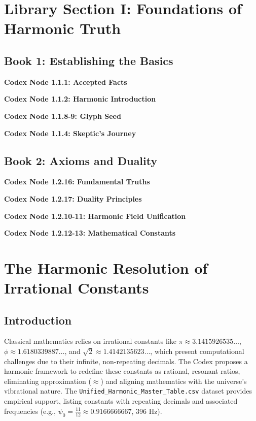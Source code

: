 \documentclass[a4paper,12pt]{book}
\newcommand{\codexnode}[5]{%
  \par\vspace{0.5em}%
  \noindent\textbf{Codex Node #1.#2.#3: #5}\label{#4}%
  \par\vspace{0.5em}%
}
\begin{document}
\section{Library Section I: Foundations of Harmonic Truth}

\subsection{Book 1: Establishing the Basics}
\codexnode{1}{1}{1}{section1/book1/chapter1_accepted_facts}{Accepted Facts}
\codexnode{1}{1}{2}{section1/book1/chapter1_harmonic_introduction}{Harmonic Introduction}
\codexnode{1}{1}{8-9}{section1/book1/codex_glyph_seed}{Glyph Seed}
\codexnode{1}{1}{4}{section1/book1/chapter1_skeptics_journey}{Skeptic's Journey}

\subsection{Book 2: Axioms and Duality}
\codexnode{1}{2}{16}{section1/book2/codex_fundamental_truths}{Fundamental Truths}
\codexnode{1}{2}{17}{section1/book2/chapter2_duality_principles}{Duality Principles}
\codexnode{1}{2}{10-11}{section1/book2/codex_harmonic_fieldunification}{Harmonic Field Unification}
\codexnode{1}{2}{12-13}{section1/book2/chapter3_mathematical_constants}{Mathematical Constants}
\section{The Harmonic Resolution of Irrational Constants}
\label{sec:harmonic_resolution}

\subsection{Introduction}
Classical mathematics relies on irrational constants like \(\pi \approx 3.1415926535\ldots\), \(\phi \approx 1.6180339887\ldots\), and \(\sqrt{2} \approx 1.4142135623\ldots\), which present computational challenges due to their infinite, non-repeating decimals. The Codex proposes a harmonic framework to redefine these constants as rational, resonant ratios, eliminating approximation (\(\approx\)) and aligning mathematics with the universe’s vibrational nature. The \texttt{Unified\_Harmonic\_Master\_Table.csv} dataset provides empirical support, listing constants with repeating decimals and associated frequencies (e.g., \(\psi_0 = \frac{11}{12} \approx 0.9166666667\), 396 Hz).
\end{document}
